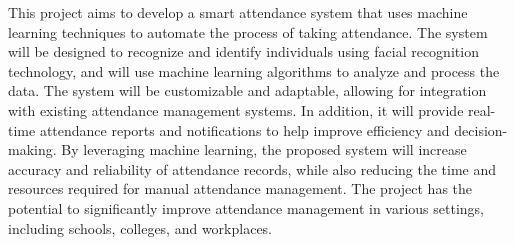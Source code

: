 This project aims to develop a smart attendance system that uses machine learning techniques to automate the process of taking attendance. The system will be designed to recognize and identify individuals using facial recognition technology, and will use machine learning algorithms to analyze and process the data. The system will be customizable and adaptable, allowing for integration with existing attendance management systems. In addition, it will provide real-time attendance reports and notifications to help improve efficiency and decision-making. By leveraging machine learning, the proposed system will increase accuracy and reliability of attendance records, while also reducing the time and resources required for manual attendance management. The project has the potential to significantly improve attendance management in various settings, including schools, colleges, and workplaces.